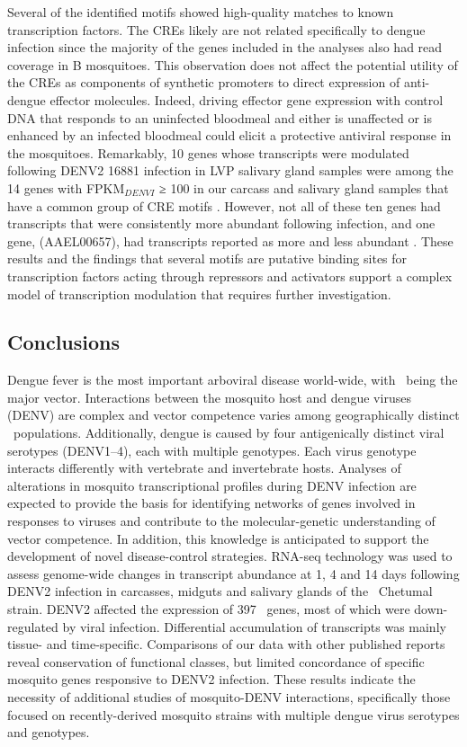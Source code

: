 Several of the identified motifs showed high-quality matches to known transcription factors.
The \glspl{CRE} likely are not related specifically to dengue infection since the majority of the genes included in the analyses also had read coverage in B mosquitoes.
This observation does not affect the potential utility of the \glspl{CRE} as components of synthetic promoters to direct expression of anti-dengue effector molecules.
Indeed, driving effector gene expression with control DNA that responds to an uninfected bloodmeal and either is unaffected or is enhanced by an infected bloodmeal could elicit a protective antiviral response in the mosquitoes.
Remarkably, 10 genes whose transcripts were modulated following \gls{DENV}2 16881 infection in \gls{LVP} salivary gland samples were among the 14 genes with FPKM$_{DENVI}$ ≥ 100 in our carcass and salivary gland samples that have a common group of \gls{CRE} motifs \cite{Luplertlop2011}.
However, not all of these ten genes had transcripts that were consistently more abundant following infection, and one gene, (AAEL00657), had transcripts reported as more and less abundant \cite{Luplertlop2011}.
These results and the findings that several motifs are putative binding sites for transcription factors acting through repressors and activators support a complex model of transcription modulation that requires further investigation.

\subsection{Conclusions}

Dengue fever is the most important arboviral disease world-wide, with \Aea\ being the major vector.
Interactions between the mosquito host and dengue viruses (\gls{DENV}) are complex and vector competence varies among geographically distinct \Aa\ populations.
Additionally, dengue is caused by four antigenically distinct viral serotypes (\gls{DENV}1–4), each with multiple genotypes.
Each virus genotype interacts differently with vertebrate and invertebrate hosts.
Analyses of alterations in mosquito transcriptional profiles during \gls{DENV} infection are expected to provide the basis for identifying networks of genes involved in responses to viruses and contribute to the molecular-genetic understanding of vector competence.
In addition, this knowledge is anticipated to support the development of novel disease-control strategies.
RNA-seq technology was used to assess genome-wide changes in transcript abundance at 1, 4 and 14 days following \gls{DENV}2 infection in carcasses, midguts and salivary glands of the \Aa\ Chetumal strain.
\gls{DENV}2 affected the expression of 397 \Aa\ genes, most of which were down-regulated by viral infection.
Differential accumulation of transcripts was mainly tissue- and time-specific.
Comparisons of our data with other published reports reveal conservation of functional classes, but limited concordance of specific mosquito genes responsive to \gls{DENV}2 infection.
These results indicate the necessity of additional studies of mosquito-\gls{DENV} interactions, specifically those focused on recently-derived mosquito strains with multiple dengue virus serotypes and genotypes.


